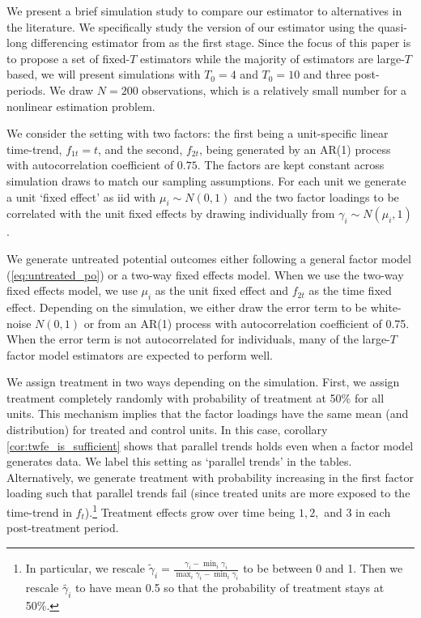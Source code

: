 \documentclass[12pt]{article}
\begin{document}
We present a brief simulation study to compare our estimator to alternatives in the literature. We specifically study the version of our estimator using the quasi-long differencing estimator from \citet{Ahn_Lee_Schmidt_2013} as the first stage. Since the focus of this paper is to propose a set of fixed-$T$ estimators while the majority of estimators are large-$T$ based, we will present simulations with $T_0 = 4$ and $T_0 = 10$ and three post-periods. We draw $N = 200$ observations, which is a relatively small number for a nonlinear estimation problem.

We consider the setting with two factors: the first being a unit-specific linear time-trend, $f_{1t} = t$, and the second, $f_{2t}$, being generated by an AR(1) process with autocorrelation coefficient of $0.75$. The factors are kept constant across simulation draws to match our sampling assumptions. For each unit we generate a unit `fixed effect' as iid with $\mu_i \sim N(0, 1)$ and the two factor loadings to be correlated with the unit fixed effects by drawing individually from $\gamma_i \sim N(\mu_i, 1)$. 

We generate untreated potential outcomes either following a general factor model (\ref{eq:untreated_po}) or a two-way fixed effects model. When we use the two-way fixed effects model, we use $\mu_i$ as the unit fixed effect and $f_{2t}$ as the time fixed effect. Depending on the simulation, we either draw the error term to be white-noise $N(0,1)$ or from an AR(1) process with autocorrelation coefficient of 0.75. When the error term is not autocorrelated for individuals, many of the large-$T$ factor model estimators are expected to perform well. 

We assign treatment in two ways depending on the simulation. First, we assign treatment completely randomly with probability of treatment at 50\% for all units. This mechanism implies that the factor loadings have the same mean (and distribution) for treated and control units. In this case, corollary \ref{cor:twfe_is_sufficient} shows that parallel trends holds even when a factor model generates data. We label this setting as `parallel trends' in the tables. Alternatively, we generate treatment with probability increasing in the first factor loading such that parallel trends fail (since treated units are more exposed to the time-trend in $f_t$).\footnote{
  In particular, we rescale $\tilde{\gamma}_i = \frac{\gamma_i - \min_i \gamma_i}{\max_i \gamma_i - \min_i \gamma_i}$ to be between 0 and 1. Then we rescale $\tilde{\gamma_i}$ to have mean 0.5 so that the probability of treatment stays at 50\%.
} 
Treatment effects grow over time being $1, 2,$ and $3$ in each post-treatment period.
\end{document}
